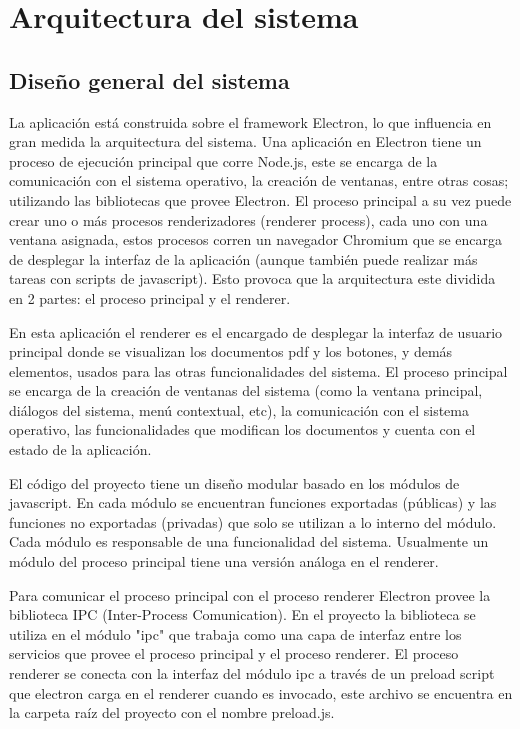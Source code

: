 \chapter{Arquitectura del sistema}
\section{Diseño general del sistema}

La aplicación está construida sobre el framework Electron, lo que influencia en gran medida la arquitectura del sistema. Una aplicación en Electron\cite{electron_home} tiene un proceso de ejecución principal que corre Node.js, este se encarga de la comunicación con el sistema operativo, la creación de ventanas, entre otras cosas; utilizando las bibliotecas que provee Electron. El proceso principal a su vez puede crear uno o más procesos renderizadores (renderer process), cada uno con una ventana asignada, estos procesos corren un navegador Chromium que se encarga de desplegar la interfaz de la aplicación (aunque también puede realizar más tareas con scripts de javascript). Esto provoca que la arquitectura este dividida en 2 partes: el proceso principal y el renderer. \cite{electron_process_model} 

En esta aplicación el renderer es el encargado de desplegar la interfaz de usuario principal donde se  visualizan los documentos pdf y los botones, y demás elementos, usados para las otras funcionalidades del sistema. El proceso principal se encarga de la creación de ventanas del sistema (como la ventana principal, diálogos del sistema, menú contextual, etc), la comunicación con el sistema operativo, las funcionalidades que modifican los documentos y cuenta con el estado de la aplicación.

El código del proyecto tiene un diseño modular basado en los módulos de javascript. En cada módulo se encuentran funciones exportadas (públicas) y las funciones no exportadas (privadas) que solo se utilizan a lo interno del módulo. Cada módulo es responsable de una funcionalidad del sistema. Usualmente un módulo del proceso principal tiene una versión análoga en el renderer.

Para comunicar el proceso principal con el proceso renderer Electron provee la biblioteca IPC (Inter-Process Comunication)\cite{electron_ipc}. En el proyecto la biblioteca se utiliza en el módulo "ipc" que trabaja como una capa de interfaz entre los servicios que provee el proceso principal y el proceso renderer. El proceso renderer se conecta con la interfaz del módulo ipc a través de un preload script que electron carga en el renderer cuando es invocado, este archivo se encuentra en la carpeta raíz del proyecto con el nombre preload.js.\cite{electron_ipc} 


